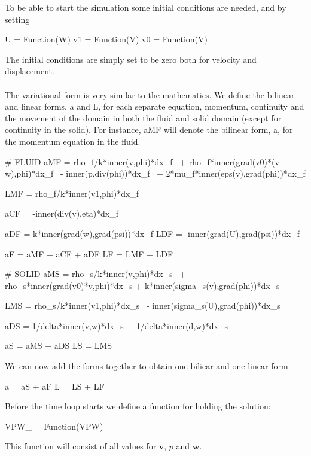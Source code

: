 To be able to start the simulation some initial conditions are needed, and by setting
\begin{cverbatim}
U = Function(W)
v1 = Function(V)
v0 = Function(V)
\end{cverbatim}
The initial conditions are simply set to be zero both for velocity and displacement.
\\
\\
The variational form is very similar to the mathematics. We define the bilinear and linear forms, a and L, for each separate equation, momentum, continuity and the movement of the domain in both the fluid and solid domain (except for continuity in the solid). For instance, aMF will denote the bilinear form, a, for the momentum equation in the fluid.
\begin{cverbatim}
# FLUID
aMF = rho_f/k*inner(v,phi)*dx_f \
	+ rho_f*inner(grad(v0)*(v-w),phi)*dx_f \
	- inner(p,div(phi))*dx_f \
	+ 2*mu_f*inner(eps(v),grad(phi))*dx_f

LMF = rho_f/k*inner(v1,phi)*dx_f

aCF = -inner(div(v),eta)*dx_f

aDF = k*inner(grad(w),grad(psi))*dx_f
LDF = -inner(grad(U),grad(psi))*dx_f

aF = aMF + aCF + aDF
LF = LMF + LDF

# SOLID
aMS = rho_s/k*inner(v,phi)*dx_s \
	+ rho_s*inner(grad(v0)*v,phi)*dx_s
	+ k*inner(sigma_s(v),grad(phi))*dx_s

LMS = rho_s/k*inner(v1,phi)*dx_s \
	- inner(sigma_s(U),grad(phi))*dx_s

aDS = 1/delta*inner(v,w)*dx_s \
	- 1/delta*inner(d,w)*dx_s

aS = aMS + aDS
LS = LMS

\end{cverbatim}
We can now add the forms together to obtain one biliear and one linear form
\begin{cverbatim}
a = aS + aF 
L = LS + LF
\end{cverbatim}
Before the time loop starts we define a function for holding the solution:
\begin{cverbatim}
VPW_ = Function(VPW)
\end{cverbatim}
This function will consist of all values for $\mathbf{v}$, $p$ and $\mathbf{w}$.
\\
\\
